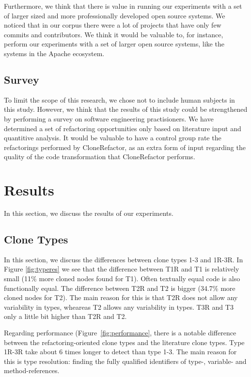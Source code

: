 Furthermore, we think that there is value in running our experiments with a set of larger sized and more professionally developed open source systems. We noticed that in our corpus there were a lot of projects that have only few commits and contributors. We think it would be valuable to, for instance, perform our experiments with a set of larger open source systems, like the systems in the Apache ecosystem.

\subsection{Survey}
To limit the scope of this research, we chose not to include human subjects in this study. However, we think that the results of this study could be strengthened by performing a survey on software engineering practisioners. We have determined a set of refactoring opportunities only based on literature input and quantitive analysis. It would be valuable to have a control group rate the refactorings performed by CloneRefactor, as an extra form of input regarding the quality of the code transformation that CloneRefactor performs.

\section{Results}
In this section, we discuss the results of our experiments.

\subsection{Clone Types}
In this section, we discuss the differences between clone types 1-3 and 1R-3R. In Figure \ref{fig:typeres} we see that the difference between T1R and T1 is relatively small (11\% more cloned nodes found for T1). Often textually equal code is also functionally equal. The difference between T2R and T2 is bigger (34.7\% more cloned nodes for T2). The main reason for this is that T2R does not allow any variability in types, wheareas T2 allows any variability in types. T3R and T3 only a little bit higher than T2R and T2.

Regarding performance (Figure~\ref{fig:performance}, there is a notable difference between the refactoring-oriented clone types and the literature clone types. Type 1R-3R take about 6 times longer to detect than type 1-3. The main reason for this is type resolution: finding the fully qualified identifiers of type-, variable- and method-references.

